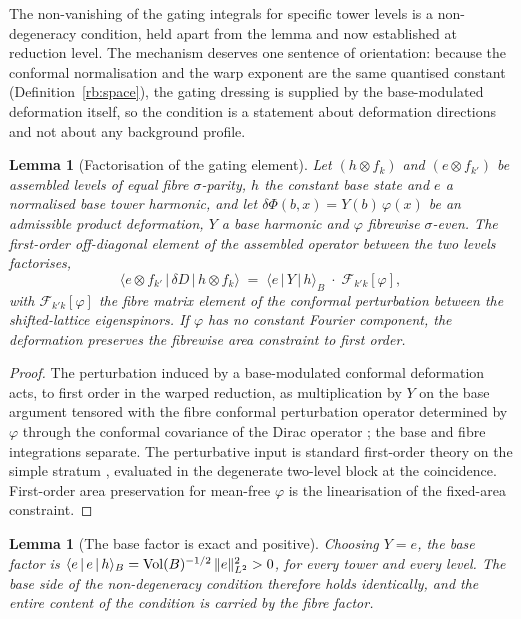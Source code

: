 \documentclass[11pt]{article}
\numberwithin{equation}{section}
\theoremstyle{plain}
\newtheorem{lemma}[theorem]{Lemma}
\theoremstyle{definition}
\theoremstyle{remark}
\begin{document}
The non-vanishing of the gating integrals for specific tower levels
is a non-degeneracy condition, held apart from the lemma and now
established at reduction level. The mechanism deserves one sentence
of orientation: because the conformal normalisation and the warp
exponent are the same quantised constant
(Definition~\ref{rb:space}), the gating dressing is supplied by the
base-modulated deformation itself, so the condition is a statement
about deformation directions and not about any background profile.

\begin{lemma}[Factorisation of the gating element]\label{ndc:factor}
Let $(h \otimes f_{k})$ and $(e \otimes f_{k'})$ be assembled
levels of equal fibre $\sigma$-parity, $h$ the constant base state
and $e$ a normalised base tower harmonic, and let
$\delta\Phi(b, x) = Y(b)\,\varphi(x)$ be an admissible product
deformation, $Y$ a base harmonic and $\varphi$ fibrewise
$\sigma$-even. The first-order off-diagonal element of the
assembled operator between the two levels factorises,
\begin{equation}\label{eq:gating}
\bigl\langle e \otimes f_{k'}\,\bigl|\,\delta D\,\bigr|\,
h \otimes f_{k}\bigr\rangle
\;=\;
\langle e \,|\, Y \,|\, h\rangle_{B}\;\cdot\;
\mathcal{F}_{k'k}[\varphi],
\end{equation}
with $\mathcal{F}_{k'k}[\varphi]$ the fibre matrix element of the
conformal perturbation between the shifted-lattice eigenspinors. If
$\varphi$ has no constant Fourier component, the deformation
preserves the fibrewise area constraint to first order.
\end{lemma}

\begin{proof}
The perturbation induced by a base-modulated conformal deformation
acts, to first order in the warped reduction, as multiplication by
$Y$ on the base argument tensored with the fibre conformal
perturbation operator determined by $\varphi$ through the conformal
covariance of the Dirac operator
\cite{Hitchin1974, Hijazi, BourguignonGauduchon1992}; the base and
fibre integrations separate. The perturbative input is standard
first-order theory on the simple stratum \cite{Kato}, evaluated in
the degenerate two-level block at the coincidence. First-order area
preservation for mean-free $\varphi$ is the linearisation of the
fixed-area constraint.
\end{proof}

\begin{lemma}[The base factor is exact and positive]\label{ndc:base}
Choosing $Y = e$, the base factor is
$\langle e \,|\, e \,|\, h\rangle_{B}
= \mathrm{Vol}(B)^{-1/2}\,\|e\|_{L^{2}}^{2} > 0$, for every tower and every
level. The base side of the non-degeneracy condition therefore
holds identically, and the entire content of the condition is
carried by the fibre factor.
\end{lemma}
\end{document}

